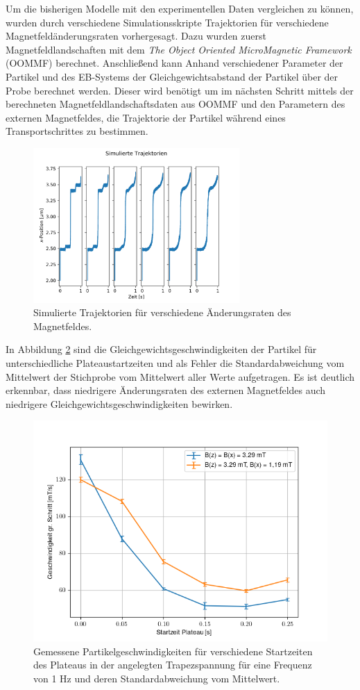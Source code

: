 \documentclass[page,pdftex,12pt,a4paper,twoside,openright]{scrbook}
\begin{document}
Um die bisherigen Modelle mit den experimentellen Daten vergleichen zu können, wurden durch verschiedene  Simulationsskripte Trajektorien für verschiedene Magnetfeldänderungsraten vorhergesagt. Dazu wurden zuerst Magnetfeldlandschaften mit dem \emph{The Object Oriented MicroMagnetic Framework} (OOMMF) \cite{donahue_oommf_1999} berechnet. Anschließend kann Anhand verschiedener Parameter der Partikel und des EB-Systems der Gleichgewichtsabstand der Partikel über der Probe berechnet werden. Dieser wird benötigt um im nächsten Schritt mittels der berechneten Magnetfeldlandschaftsdaten aus OOMMF und den Parametern des externen Magnetfeldes, die Trajektorie der Partikel während eines Transportschrittes zu bestimmen.

\begin{figure}[htbp]
\centering
\includegraphics[width=0.7\textwidth]{./img/sim.png}
\caption{\label{fig-traj_sim}
Simulierte Trajektorien für verschiedene Änderungsraten des Magnetfeldes.}
\end{figure}

In Abbildung \ref{fig-img_v} sind die Gleichgewichtsgeschwindigkeiten der Partikel für unterschiedliche Plateaustartzeiten und als Fehler die Standardabweichung vom Mittelwert der Stichprobe vom Mittelwert aller Werte aufgetragen. Es ist deutlich erkennbar, dass niedrigere Änderungsraten des externen Magnetfeldes auch niedrigere Gleichgewichtsgeschwindigkeiten bewirken.

\begin{figure}[!h]
\centering
\includegraphics[width=.75\textwidth]{./img/v.png}
\caption{\label{fig-img_v}
Gemessene Partikelgeschwindigkeiten für verschiedene Startzeiten des Plateaus in der angelegten Trapezspannung für eine Frequenz von 1 Hz und deren Standardabweichung vom Mittelwert.}
\end{figure}
\end{document}
